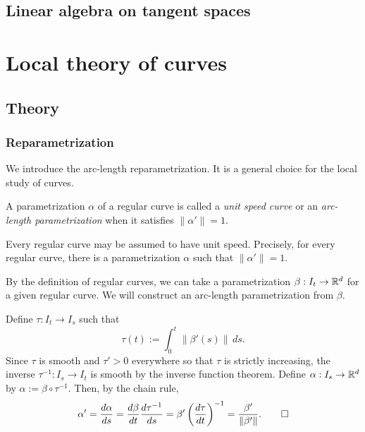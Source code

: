 \documentclass{../exp}
\def\a{\alpha}
\begin{document}


\subsection{Linear algebra on tangent spaces}











\section{Local theory of curves}

\subsection{Theory}

\subsubsection{Reparametrization}

We introduce the arc-length reparametrization.
It is a general choice for the local study of curves.
\begin{defn}
A parametrization $\a$ of a regular curve is called a \emph{unit speed curve} or an \emph{arc-length parametrization} when it satisfies $\|\a'\|=1$.
\end{defn}
\begin{thm}
Every regular curve may be assumed to have unit speed.
Precisely, for every regular curve, there is a parametrization $\a$ such that $\|\a'\|=1$.
\end{thm}
\begin{pf}
By the definition of regular curves, we can take a parametrization $\beta:I_t\to\R^d$ for a given regular curve.
We will construct an arc-length parametrization from $\beta$.

Define $\tau:I_t\to I_s$ such that
\[\tau(t):=\int_0^t\|\beta'(s)\|\,ds.\]
Since $\tau$ is smooth and $\tau'>0$ everywhere so that $\tau$ is strictly increasing, the inverse $\tau^{-1}:I_s\to I_t$ is smooth by the inverse function theorem.
Define $\a:I_s\to\R^d$ by $\a:=\beta\circ\tau^{-1}$.
Then, by the chain rule,
\[\a'=\dd{\a}{s}=\dd{\beta}{t}\dd{\tau^{-1}}{s}=\beta'\left(\dd{\tau}{t}\right)^{-1}=\frac{\beta'}{\|\beta'\|}.\qedhere\]
\end{pf}
\end{document}
